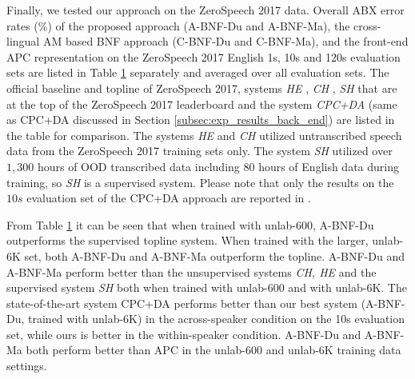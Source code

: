 \documentclass[transmag]{IEEEtran}
\begin{document}
\begin{table}[!t]
{\begin{tabular}{l|ccc|c|ccc|c}
\midrule[0.2pt]
\bottomrule
\end{tabular}%

}
\label{tab:exp_results_zrsc2017}
\end{table}
Finally, we tested our approach on the ZeroSpeech 2017 data. Overall ABX error rates  ($\%$) of the proposed approach (A-BNF-Du and A-BNF-Ma), the cross-lingual AM based BNF approach (C-BNF-Du and C-BNF-Ma), and the front-end APC representation on the ZeroSpeech 2017 English 1s, 10s and 120s evaluation sets are listed in Table \ref{tab:exp_results_zrsc2017} separately and averaged over all evaluation sets. The official baseline and topline of ZeroSpeech 2017,   systems   \textit{HE} \cite{heck2017feature}, \textit{CH} \cite{chorowski2019unsupervised}, \textit{SH} \cite{shibata2017composite} that are at the top of the ZeroSpeech 2017 leaderboard  and the system \textit{CPC+DA} \cite{Kharitonov2020data_augment} (same as CPC+DA discussed in Section \ref{subsec:exp_results_back_end})  are listed in the table for comparison. The systems \textit{HE} and \textit{CH} utilized untranscribed speech data from the ZeroSpeech 2017 training sets only. The system \textit{SH} utilized over $1,300$ hours of OOD transcribed data including $80$ hours of English data during training, so \textit{SH} is a supervised system. Please note that only the results on the $10s$ evaluation set of the CPC+DA approach are reported in \cite{Kharitonov2020data_augment}.

From Table \ref{tab:exp_results_zrsc2017} it can be seen that when trained with unlab-600, A-BNF-Du outperforms the supervised topline system. When trained with the larger, unlab-6K set, both A-BNF-Du and A-BNF-Ma outperform the topline. A-BNF-Du and A-BNF-Ma perform better than the unsupervised systems \textit{CH, HE} and the supervised system \textit{SH} both when trained with unlab-600 and with unlab-6K.
The state-of-the-art system CPC+DA performs better than our best system (A-BNF-Du, trained with unlab-6K) in the across-speaker condition on the 10s evaluation set, while ours is better in the within-speaker condition. A-BNF-Du and A-BNF-Ma both perform better than APC in the unlab-600 and unlab-6K training data settings.
\end{document}

